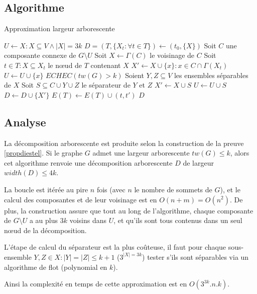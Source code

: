 
\subsection{Algorithme}
\label{algo}
\begin{center}
\begin{algorithm}[H]
\caption{Approximation largeur arborescente}\label{algo_tw}
\begin{algorithmic}[1]
	\STATE $U \leftarrow X : X \subseteq V \wedge |X| = 3k$
	\STATE $D = (T,\{X_t : \forall t \in T\}) \leftarrow (t_0,\{X\})$
		\STATE Soit $C$ une composante connexe de $G \setminus U$
		\STATE Soit $X \leftarrow \Gamma(C)$ le voisinage de $C$
		\STATE Soit $t \in T : X \subseteq X_t$ le n\oe ud de $T$ contenant $X$
			\STATE $X' \leftarrow X \cup \{x\} : x \in C \cap \Gamma(X_t)$
			\STATE $U \leftarrow U \cup \{x\}$
		\ELSE
				\RETURN $ECHEC (tw(G) > k)$
			\ELSE
				\STATE Soient $Y,Z \subseteq V$ les ensembles séparables
				de $X$
				\STATE Soit $S \subseteq C \cup Y \cup Z$ le séparateur de $Y$ et $Z$
				\STATE $X' \leftarrow X \cup S$
				\STATE $U \leftarrow U \cup S$
			\ENDIF
		\ENDIF
		\STATE $D \leftarrow D \cup \{X'\}$
		\STATE $E(T) \leftarrow E(T) \cup (t,t')$
	\ENDWHILE
	\RETURN $D$
\end{algorithmic}
\end{algorithm}
\end{center}

\subsection{Analyse}
\label{analyse}
La décomposition arborescente est produite selon la construction de la preuve \ref{propdiestel}.
Si le graphe $G$ admet une largeur arborescente $tw(G) \leq k$,
alors cet algorithme renvoie une décomposition arborescente $D$ de largeur $width(D) \leq 4k$.

La boucle est itérée au pire $n$ fois (avec $n$ le nombre de sommets de $G$), et le calcul des
composantes et de leur voisinage est en $O(n+m) = O(n^2)$.
De plus, la construction assure que tout au long de l'algorithme, chaque composante de $G \setminus U$
a au plus $3k$ voisins dans $U$, et qu'ils sont tous contenus dans un seul n\oe ud de la décomposition.

L'étape de calcul du séparateur est la plus coûteuse, il faut pour 
chaque sous-ensemble $Y,Z \in X : |Y| = |Z| \leq k + 1$ ($3^{|X| = 3k}$) tester
s'ils sont séparables via un algorithme de flot (polynomial en $k$).

Ainsi la complexité en temps de cette approximation est en $O(3^{3k}.n.k)$.

